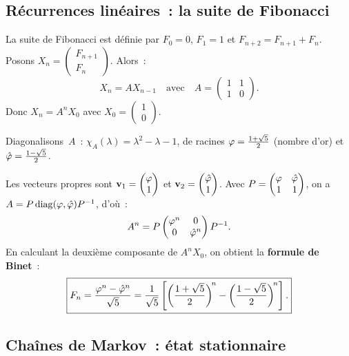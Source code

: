 \subsection{Récurrences linéaires~: la suite de Fibonacci}\label{subsec:fibonacci}

La suite de Fibonacci est définie par $F_0=0$, $F_1=1$ et
$F_{n+2}=F_{n+1}+F_n$. Posons
$X_n=\begin{pmatrix}F_{n+1}\\F_n\end{pmatrix}$. Alors~:
\[
  X_n=AX_{n-1}\quad\text{avec}\quad
  A=\begin{pmatrix}1&1\\1&0\end{pmatrix}.
\]
Donc $X_n=A^n X_0$ avec $X_0=\begin{pmatrix}1\\0\end{pmatrix}$.

Diagonalisons~$A$~: $\chi_A(\lambda)=\lambda^2-\lambda-1$, de racines
$\varphi=\frac{1+\sqrt{5}}{2}$ (nombre d'or) et
$\hat{\varphi}=\frac{1-\sqrt{5}}{2}$.

Les vecteurs propres sont
$\mathbf{v}_1=\begin{pmatrix}\varphi\\1\end{pmatrix}$ et
$\mathbf{v}_2=\begin{pmatrix}\hat{\varphi}\\1\end{pmatrix}$.
Avec $P=\begin{pmatrix}\varphi&\hat{\varphi}\\1&1\end{pmatrix}$, on a
$A=P\operatorname{diag}(\varphi,\hat{\varphi}){P}^{-1}$, d'où~:
\[
  A^n=P\begin{pmatrix}\varphi^n&0\\0&\hat{\varphi}^n\end{pmatrix}{P}^{-1}.
\]
En calculant la deuxième composante de $A^n X_0$, on obtient la
\textbf{formule de Binet}~:
\[
  \boxed{F_n=\frac{\varphi^n-\hat{\varphi}^n}{\sqrt{5}}
  =\frac{1}{\sqrt{5}}\left[\left(\frac{1+\sqrt{5}}{2}\right)^{\!n}
  -\left(\frac{1-\sqrt{5}}{2}\right)^{\!n}\right].}
\]

\subsection{Chaînes de Markov~: état stationnaire}\label{subsec:markov-ch5}

